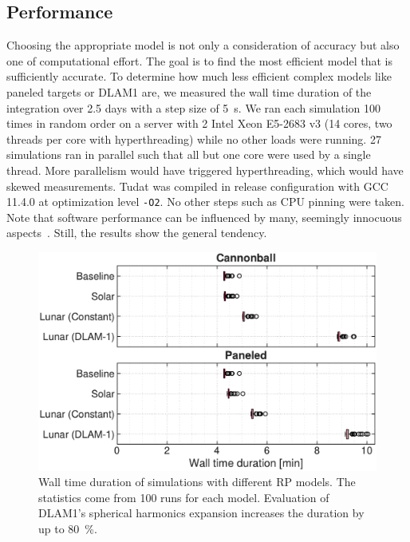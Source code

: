 







\subsection{Performance}
Choosing the appropriate model is not only a consideration of accuracy but also one of computational effort. The goal is to find the most efficient model that is sufficiently accurate. To determine how much less efficient complex models like paneled targets or \gls{DLAM1} are, we measured the wall time duration of the integration over 2.5 days with a step size of \qty{5}{\s}. We ran each simulation 100 times in random order on a server with 2 Intel Xeon E5-2683 v3 (14 cores, two threads per core with hyperthreading) while no other loads were running. 27 simulations ran in parallel such that all but one core were used by a single thread. More parallelism would have triggered hyperthreading, which would have skewed measurements. \gls{Tudat} was compiled in release configuration with GCC 11.4.0 at optimization level \texttt{-O2}. No other steps such as CPU pinning were taken. Note that software performance can be influenced by many, seemingly innocuous aspects~\cite{Mytkowicz2009}. Still, the results show the general tendency.

\begin{figure}[b]
    \centering
    \includegraphics[width=\linewidth]{figures/plots/performance.pdf}
    \caption{Wall time duration of simulations with different \gls{RP} models. The statistics come from 100 runs for each model. Evaluation of \gls{DLAM1}'s spherical harmonics expansion increases the duration by up to \qty{80}{\percent}.}
    \label{fig:performance}
\end{figure}

